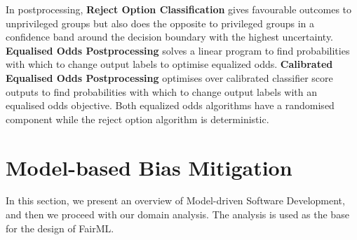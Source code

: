 \documentclass[sigconf,review]{acmart}
\begin{document}

%




In postprocessing, \textbf{Reject Option Classification} \cite{kamiran2012reject} gives favourable outcomes to unprivileged groups but also does the opposite to privileged groups in a confidence band around the decision boundary with the highest uncertainty.
\textbf{Equalised Odds Postprocessing} \cite{hardt2016equal,pleiss2017equal} solves a linear program to find probabilities with which to change output labels to optimise equalized odds.
\textbf{Calibrated Equalised Odds Postprocessing} \cite{pleiss2017equal} optimises over calibrated classifier score outputs to find probabilities with which to change output labels with an equalised odds
objective. 
Both equalized odds algorithms have a randomised component while the reject option algorithm is deterministic.


\section{Model-based Bias Mitigation}
\label{sec:model_based_bias_mitigation}

In this section, we present an overview of Model-driven Software Development, and then we proceed with our domain analysis. The analysis is used as the base for the design of FairML. 
\end{document}
